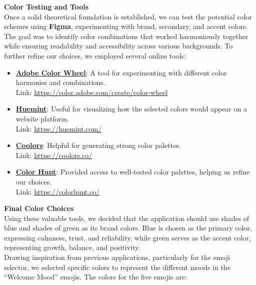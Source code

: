 \vspace{5mm}

\noindent \textbf{Color Testing and Tools} \\
Once a solid theoretical foundation is established, we can test the potential color schemes using \textbf{Figma}, experimenting with brand, secondary, and accent colors. The goal was to identify color combinations that worked harmoniously together while ensuring readability and accessibility across various backgrounds. To further refine our choices, we employed several online tools:

\begin{itemize}
    \item \textbf{\href{https://color.adobe.com/create/color-wheel}{Adobe Color Wheel}}: A tool for experimenting with different color harmonies and combinations. \\
    Link: \url{https://color.adobe.com/create/color-wheel}
    \item \textbf{\href{https://huemint.com/}{Huemint}}: Useful for visualizing how the selected colors would appear on a website platform. \\
    Link: \url{https://huemint.com/}
    \item \textbf{\href{https://coolors.co/}{Coolors}}: Helpful for generating strong color palettes. \\
    Link: \url{https://coolors.co/}
    \item \textbf{\href{https://colorhunt.co/}{Color Hunt}}: Provided access to well-tested color palettes, helping us refine our choices. \\
    Link: \url{https://colorhunt.co/}
\end{itemize}


\vspace{5mm}

\noindent \textbf{Final Color Choices} \\
Using these valuable tools, we decided that the application should use shades of blue and shades of green as its brand colors. Blue is chosen as the primary color, expressing calmness, trust, and reliability, while green serves as the accent color, representing growth, balance, and positivity.\vspace{5mm} \\
Drawing inspiration from previous applications, particularly for the emoji selector, we selected specific colors to represent the different moods in the ``Welcome Mood'' emojis. The colors for the five emojis are:

